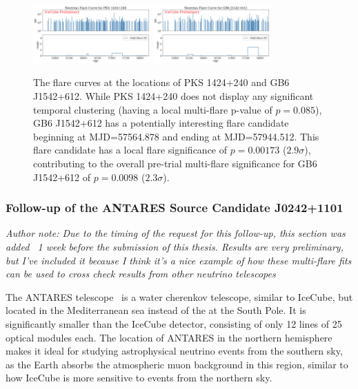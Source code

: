 \begin{figure}[h]
\centering
\includegraphics[width=0.4\textwidth]{figs/fcurve_PKS1424+240.png}
\includegraphics[width=0.4\textwidth]{figs/fcurve_GB6.png}
\caption{The flare curves at the locations of PKS 1424+240 and GB6 J1542+612. While PKS 1424+240 does not display any significant temporal clustering (having a local multi-flare p-value of $p=0.085$), GB6 J1542+612 has a potentially interesting flare candidate beginning at MJD=57564.878 and ending at MJD=57944.512. This flare candidate has a local flare significance of $p=0.00173$ ($2.9 \sigma$), contributing to the overall pre-trial multi-flare significance for GB6 J1542+612 of $p=0.0098$ ($2.3 \sigma$). }
\label{fig:othertints}
\end{figure}


\subsubsection{Follow-up of the ANTARES Source Candidate J0242+1101}
\textit{Author note: Due to the timing of the request for this follow-up, this section was added ~1 week before the submission of this thesis. Results are very preliminary, but I've included it because I think it's a nice example of how these multi-flare fits can be used to cross check results from other neutrino telescopes}

The ANTARES telescope~\cite{antarescollaboration2011antares} is a water cherenkov telescope, similar to IceCube, but located in the Mediterranean sea instead of the at the South Pole. It is significantly smaller than the IceCube detector, consisting of only 12 lines of 25 optical modules each. The location of ANTARES in the northern hemisphere makes it ideal for studying astrophysical neutrino events from the southern sky, as the Earth absorbs the atmospheric muon background in this region, similar to how IceCube is more sensitive to events from the northern sky. 

